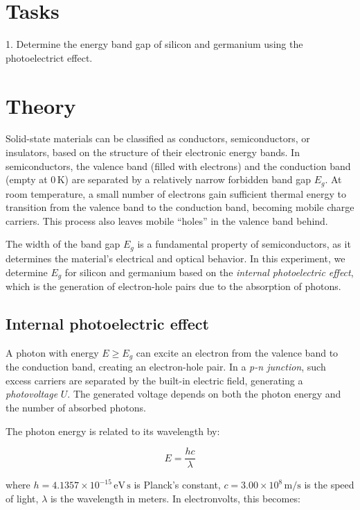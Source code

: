 \documentclass[english,11pt,a4paper]{article}
\begin{document}
	\begin{multicols}{2}
		\section{Tasks}
	
	1. Determine the energy band gap of silicon and germanium using the photoelectrict effect.

		\section{Theory}
		
		Solid-state materials can be classified as conductors, semiconductors, or insulators, based on the structure of their electronic energy bands. In semiconductors, the valence band (filled with electrons) and the conduction band (empty at $0\,\mathrm{K}$) are separated by a relatively narrow forbidden band gap $E_g$. At room temperature, a small number of electrons gain sufficient thermal energy to transition from the valence band to the conduction band, becoming mobile charge carriers. This process also leaves mobile “holes” in the valence band behind.
		
		The width of the band gap $E_g$ is a fundamental property of semiconductors, as it determines the material's electrical and optical behavior. In this experiment, we determine $E_g$ for silicon and germanium based on the \emph{internal photoelectric effect}, which is the generation of electron-hole pairs due to the absorption of photons.
		
		\subsection{Internal photoelectric effect}
		
		A photon with energy $E \geq E_g$ can excite an electron from the valence band to the conduction band, creating an electron-hole pair. In a \textit{p-n junction}, such excess carriers are separated by the built-in electric field, generating a \emph{photovoltage} $U$. The generated voltage depends on both the photon energy and the number of absorbed photons.
		
		The photon energy is related to its wavelength by:
		
	
		\begin{equation}
			E = \frac{hc}{\lambda}
		\end{equation}
	
		
		where  
		$h = 4.1357 \times 10^{-15} \, \mathrm{eV\,s}$ is Planck's constant,  
		$c = 3.00 \times 10^8 \, \mathrm{m/s}$ is the speed of light,  
		$\lambda$ is the wavelength in meters.  
		In electronvolts, this becomes:
		

\end{multicols}
\end{document}
